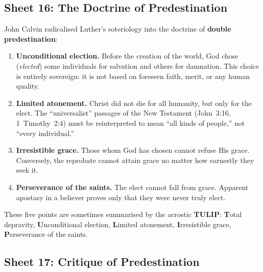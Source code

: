 \subsection{Sheet 16: The Doctrine of Predestination}

John Calvin radicalised Luther's soteriology into the
doctrine of \textbf{double predestination}:

\begin{enumerate}
  \item \textbf{Unconditional election.}
    Before the creation of the world, God chose (\emph{elected}) some
    individuals for salvation and others for damnation.  This choice is
    entirely sovereign: it is not based on foreseen faith, merit, or any
    human quality.
  \item \textbf{Limited atonement.}
    Christ did not die for all humanity, but only for the elect.
    The ``universalist'' passages of the New Testament
    (John~3:16, 1~Timothy~2:4) must be reinterpreted to mean ``all kinds
    of people,'' not ``every individual.''
  \item \textbf{Irresistible grace.}
    Those whom God has chosen cannot refuse His grace.  Conversely, the
    reprobate cannot attain grace no matter how earnestly
    they seek it.
  \item \textbf{Perseverance of the saints.}
    The elect cannot fall from grace.  Apparent apostasy in a believer
    proves only that they were never truly elect.
\end{enumerate}

These five points are sometimes summarised by the acrostic
\textbf{TULIP}:\linebreak
\textbf{T}otal depravity,
\textbf{U}nconditional election,
\textbf{L}imited atonement,
\textbf{I}rresistible grace,
\textbf{P}erseverance of the saints.

\subsection{Sheet 17: Critique of Predestination}

